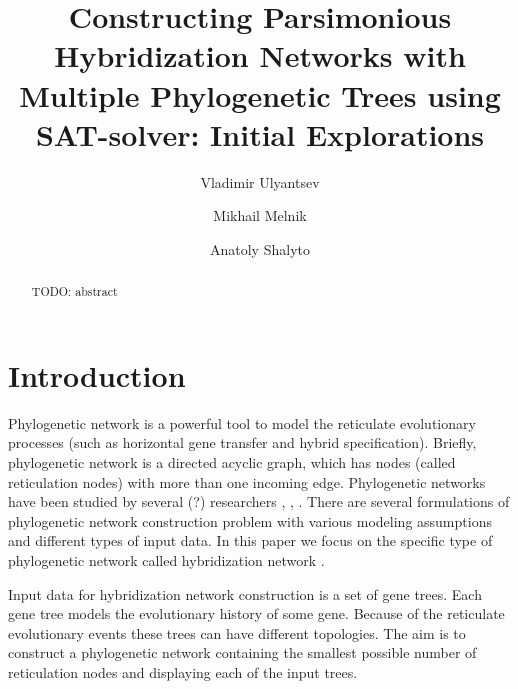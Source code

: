 \documentclass[runningheads, envcountsame, a4paper]{llncs}
\begin{document}
\mainmatter           
\title{Constructing Parsimonious Hybridization Networks with Multiple Phylogenetic Trees using SAT-solver: Initial Explorations}
\titlerunning{ } 
\toctitle{ }

\author{Vladimir Ulyantsev \and Mikhail Melnik \and Anatoly Shalyto}
%

\maketitle
\setcounter{footnote}{0}

\begin{abstract}
  TODO: abstract

\end{abstract}

\section{Introduction}

Phylogenetic network is a powerful tool to model the reticulate
evolutionary processes (such as horizontal gene transfer and hybrid specification).
Briefly, phylogenetic network is a directed acyclic graph, which has
nodes (called reticulation nodes) with more than one incoming edge. Phylogenetic
networks have been studied by several (?) researchers \cite{huson2010phylogenetic}, \cite{morrison2011introduction}, 
\cite{nakhleh2011evolutionary}. There are several formulations of phylogenetic network
construction problem with various modeling assumptions and different types of input data. 
In this paper we focus on the specific type of phylogenetic network called hybridization
network \cite{semple2006hybridization}.

Input data for hybridization network construction is a set of gene trees. %
Each gene tree models the evolutionary history of some gene. %
Because of the reticulate evolutionary events these trees can have different topologies.
The aim is to construct a phylogenetic network
containing the smallest possible number of reticulation nodes and displaying each of the input trees. 
\end{document}
